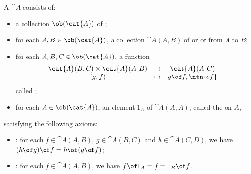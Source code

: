\begin{defn}
A %
%
%
$\cat{A}$ consists of:
% 
\begin{itemize}
\item 
a collection $\ob(\cat{A})$%
%
%
of ;%
%
%

\item 
for each $A, B \in \ob(\cat{A})$, a collection $\cat{A}(A, B)$%
%
%
of %
%
%
or %
%
%
or %
%
% 
from $A$ to $B$;

\item 
for each $A, B, C \in \ob(\cat{A})$, a function
\[
\begin{array}{ccc}
\cat{A}(B, C) \times \cat{A}(A, B) &
\to	&
\cat{A}(A, C)	\\
(g, f)	&
\mapsto	&
g \of f,%
%
\ntn{of}
%
\end{array}
\]
called ;%
%
%

\item 
for each $A \in \ob(\cat{A})$, an element $1_A$%
%
%
of $\cat{A}(A, A)$, called the %
%
%
on $A$,
\end{itemize}
% 
satisfying the following axioms:
% 
\begin{itemize}
\item 
{}:%
%
%
for each $f \in \cat{A}(A, B)$, $g \in \cat{A}(B, C)$ and $h \in \cat{A}(C,
D)$, we have $(h \of g) \of f = h \of (g \of f)$;

\item 
{}: for each $f \in \cat{A}(A, B)$, we have $f \of 1_A = f = 1_B \of f$.
\end{itemize}
\end{defn}

